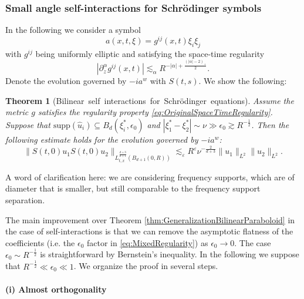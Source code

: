 \documentclass{amsart}
\newtheorem{theorem}{Theorem}[section]
\theoremstyle{definition}
\begin{document}
\subsubsection{Small angle self-interactions for Schr\"odinger symbols}
In the following we consider a symbol
\begin{equation*}
a(x,t,\xi) = g^{ij}(x,t) \xi_i \xi_j 
\end{equation*}
with $g^{ij}$ being uniformly elliptic and satisfying the space-time regularity
\begin{equation}
\label{eq:OriginalSpaceTimeRegularity}
|\partial_z^{\alpha} g^{ij}(x,t)| \lesssim_{\alpha}
R^{-|\alpha| + \frac{(|\alpha|-2)_+}{2}}.
\end{equation}
Denote the evolution governed by $-ia^w$ with $S(t,s)$. We show the following:
\begin{theorem}[Bilinear~self~interactions~for~Schr\"odinger~equations]
\label{thm:BilinearSelfinteractionsSEQ}
Assume the metric $g$ satisfies the regularity property \eqref{eq:OriginalSpaceTimeRegularity}.
Suppose that $\text{supp}(\hat{u}_i) \subseteq B_d(\xi_i^*, \epsilon_0)$ and $|\xi_1^* - \xi_2^*| \sim \nu \gg \epsilon_0 \gtrsim R^{-\frac{1}{2}}$. Then the following estimate  holds for the evolution governed by $-i a^w$:
\begin{equation*}
\| S(t,0) u_1 S(t,0) u_2 \|_{L^{\frac{d+3}{d+1}}_{t,x}(B_{d+1}(0,R))} \lesssim_{\varepsilon} R^{\varepsilon} \nu^{-\frac{2}{d+3}} \| u_1 \|_{L^2} \| u_2 \|_{L^2}.
\end{equation*}
\end{theorem}
A word of clarification here: we are considering frequency supports, which are of diameter that is smaller, but still comparable to the frequency support separation.

The main improvement over Theorem \ref{thm:GeneralizationBilinearParaboloid} in the case of self-interactions is that we can remove the asymptotic flatness of the coefficients (i.e. the $\epsilon_0$ factor in \eqref{eq:MixedRegularity}) as $\epsilon_0 \to 0$. The case $\epsilon_0 \sim R^{-\frac{1}{2}}$ is straightforward by Bernstein's inequality. In the following we suppose that $R^{-\frac{1}{2}} \ll \epsilon_0 \ll 1$. We organize the proof in several steps.

\bigskip

\paragraph{\textbf{(i) Almost orthogonality}}
\end{document}

